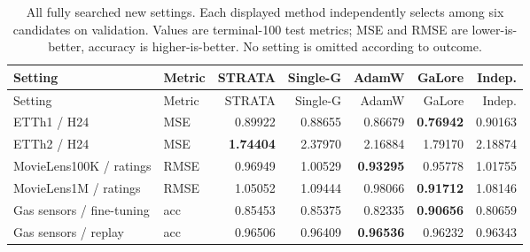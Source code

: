 {\footnotesize\setlength{\tabcolsep}{3pt}\begin{longtable}{llrrrrr}\caption{All fully searched new settings. Each displayed method independently selects among six candidates on validation. Values are terminal-100 test metrics; MSE and RMSE are lower-is-better, accuracy is higher-is-better. No setting is omitted according to outcome.}\label{tab:new-families-complete}\\\toprule Setting & Metric & STRATA & Single-G & AdamW & GaLore & Indep.\\\midrule\endfirsthead\toprule Setting & Metric & STRATA & Single-G & AdamW & GaLore & Indep.\\\midrule\endhead
ETTh1 / H24 & MSE & \cellcolor{oursbg}0.89922 & 0.88655 & 0.86679 & \textbf{0.76942} & 0.90163 \\
ETTh2 / H24 & MSE & \cellcolor{oursbg}\textbf{1.74404} & 2.37970 & 2.16884 & 1.79170 & 2.18874 \\
MovieLens100K / ratings & RMSE & \cellcolor{oursbg}0.96949 & 1.00529 & \textbf{0.93295} & 0.95778 & 1.01755 \\
MovieLens1M / ratings & RMSE & \cellcolor{oursbg}1.05052 & 1.09444 & 0.98066 & \textbf{0.91712} & 1.08146 \\
Gas sensors / fine-tuning & acc & \cellcolor{oursbg}0.85453 & 0.85375 & 0.82335 & \textbf{0.90656} & 0.80659 \\
Gas sensors / replay & acc & \cellcolor{oursbg}0.96506 & 0.96409 & \textbf{0.96536} & 0.96232 & 0.96343 \\
\bottomrule\end{longtable}}
\clearpage
